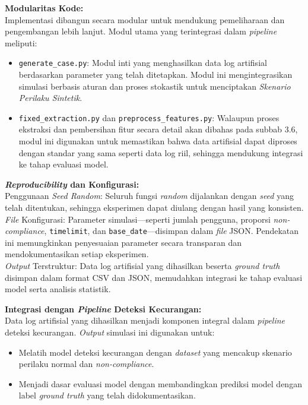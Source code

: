 \textbf{Modularitas Kode:} \\
Implementasi dibangun secara modular untuk mendukung pemeliharaan dan pengembangan lebih lanjut. Modul utama yang terintegrasi dalam \textit{pipeline} meliputi:
\begin{itemize}
    \item \texttt{generate\_case.py}: Modul inti yang menghasilkan data log artifisial berdasarkan parameter yang telah ditetapkan. Modul ini mengintegrasikan simulasi berbasis aturan dan proses stokastik untuk menciptakan \textit{Skenario Perilaku Sintetik}.
    \item \texttt{fixed\_extraction.py} dan \texttt{preprocess\_features.py}: Walaupun proses ekstraksi dan pembersihan fitur secara detail akan dibahas pada subbab 3.6, modul ini digunakan untuk memastikan bahwa data artifisial dapat diproses dengan standar yang sama seperti data log riil, sehingga mendukung integrasi ke tahap evaluasi model.
\end{itemize}

\textbf{\textit{Reproducibility} dan Konfigurasi:} \\
Penggunaan \textit{Seed Random}: Seluruh fungsi \textit{random} dijalankan dengan \textit{seed} yang telah ditentukan, sehingga eksperimen dapat diulang dengan hasil yang konsisten. \\
\textit{File} Konfigurasi: Parameter simulasi---seperti jumlah pengguna, proporsi \textit{non-compliance}, \texttt{timelimit}, dan \texttt{base\_date}---disimpan dalam \textit{file} JSON. Pendekatan ini memungkinkan penyesuaian parameter secara transparan dan mendokumentasikan setiap eksperimen. \\
\textit{Output} Terstruktur: Data log artifisial yang dihasilkan beserta \textit{ground truth} disimpan dalam format CSV dan JSON, memudahkan integrasi ke tahap evaluasi model serta analisis statistik.

\textbf{Integrasi dengan \textit{Pipeline} Deteksi Kecurangan:} \\
Data log artifisial yang dihasilkan menjadi komponen integral dalam \textit{pipeline} deteksi kecurangan. \textit{Output} simulasi ini digunakan untuk:
\begin{itemize}
    \item Melatih model deteksi kecurangan dengan \textit{dataset} yang mencakup skenario perilaku normal dan \textit{non-compliance}.
    \item Menjadi dasar evaluasi model dengan membandingkan prediksi model dengan label \textit{ground truth} yang telah didokumentasikan.
\end{itemize}

